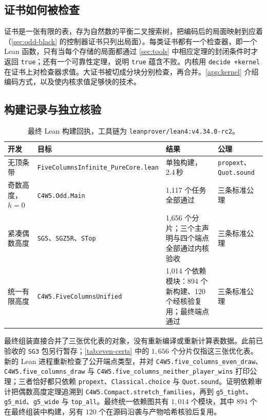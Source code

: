 \documentclass[11pt,a4paper]{article}
\theoremstyle{zhthm}
\newcommand{\code}[1]{{\upshape\texttt{\small\nolinkurl{#1}}}}
\begin{document}
\subsection{证书如何被检查}

证书是一张有限的表，存为自然数的平衡二叉搜索树，把编码后的局面映射到应着（\cref{sec:odd-black} 的控制器证书只列出局面）。每类证书都有一个检查器，即一个 Lean 函数，只有当每个存储的局面都通过 \cref{sec:tools} 中相应定理的封闭条件时才返回 \code{true}；还有一个可靠性定理，说明 \code{true} 蕴含不败。内核用 \code{decide +kernel} 在证书上对检查器求值。大证书被切成分块分别检查，再合并。\cref{app:kernel} 介绍编码方式，以及使内核求值足够快的技术。

\subsection{构建记录与独立核验}
\label{sec:receipts}


\begin{table}[!htbp]
\centering
\caption{最终 Lean 构建回执，工具链为 \code{leanprover/lean4:v4.34.0-rc2}。}
\label{tab:receipts}
\footnotesize
\begin{tabularx}{\linewidth}{@{}L{2.35cm} L{4.15cm} Y L{2.6cm}@{}}
\toprule
\textbf{开发} & \textbf{目标} & \textbf{结果} & \textbf{公理} \\
\midrule
无顶条带 & \code{FiveColumnsInfinite_PureCore.lean} & 单独构建，2.4\,秒 & \code{propext}、\code{Quot.sound} \\
奇数高度，$h=0$ & \code{C4W5.Odd.Main} & 1{,}117 个任务全部通过 & 三条标准公理 \\
紧凑偶数高度 & \code{SG5}、\code{SGZ5R}、\code{STop} & 1{,}656 个分片；三个主声明与四个端点全部通过内核验收 & 三条标准公理 \\
统一有限高度 & \code{C4W5.FiveColumnsUnified} & 1{,}014 个依赖模块：894 个新构建、120 个经核验复用；最终端点通过 & 三条标准公理 \\
\bottomrule
\end{tabularx}
\end{table}

最终组装直接合并了三张优化表的对象，没有重新编译或重新计算表数据。此前已验收的 \code{SG3} 包另行暂存；\cref{tab:even-certs} 中的 $1{,}656$ 个分片仅指这三张优化表。新的 Lean 进程重新检查了公开端点类型，并对 \code{C4W5.five_columns_even_draw}、\code{C4W5.five_columns_draw} 与 \code{C4W5.five_columns_neither_player_wins} 打印公理；三者恰好都只依赖 \code{propext}、\code{Classical.choice} 与 \code{Quot.sound}。证明依赖审计把偶数高度定理追溯到 \code{C4W5.Compact.stretch_families}，再到 \code{g5_tight}、\code{g5_mid}、\code{g5_wide} 与 \code{top_all}。最终统一依赖图共有 $1{,}014$ 个模块，其中 $894$ 个在最终组装中构建，另有 $120$ 个在源码沿袭与产物哈希核验后复用。
\end{document}
